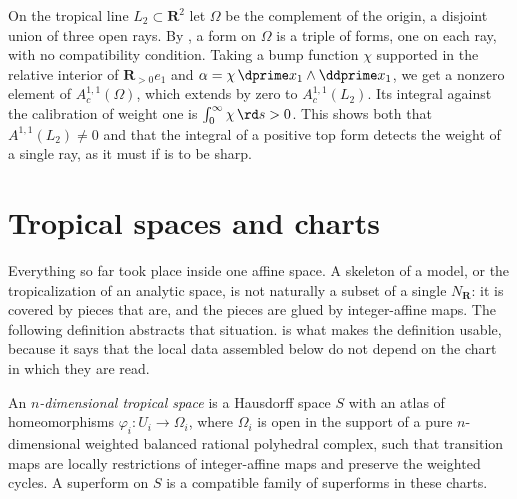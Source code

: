 \begin{example}
\label{ex:ch10-form-one-ray}
On the tropical line $L_2\subset\mathbf R^2$ let $\Omega$ be the complement
of the origin, a disjoint union of three open rays.  By
, a form on $\Omega$ is a triple of forms, one on
each ray, with no compatibility condition.  Taking a bump function $\chi$
supported in the relative interior of $\mathbf R_{>0}e_1$ and
$\alpha=\chi\,\dprime x_1\wedge\ddprime x_1$, we get a nonzero element of
$A^{1,1}_c(\Omega)$, which extends by zero to $A^{1,1}_c(L_2)$.  Its integral
against the calibration of weight one is $\int_0^\infty\chi\,\rd s>0$.  This
shows both that $A^{1,1}(L_2)\neq0$ and that the integral of a positive top
form detects the weight of a single ray, as it must if
 is to be sharp.
\end{example}

\section{Tropical spaces and charts}
\label{sec:ch10-tropical-spaces}

Everything so far took place inside one affine space.  A skeleton of a model,
or the tropicalization of an analytic space, is not naturally a subset of a
single $N_{\mathbf R}$: it is covered by pieces that are, and the pieces are
glued by integer-affine maps.  The following definition abstracts that
situation.   is what makes the
definition usable, because it says that the local data assembled below do not
depend on the chart in which they are read.

\begin{definition}
\label{def:ch10-tropical-space}
An \emph{$n$-dimensional tropical space} is a Hausdorff space $S$ with an
atlas of homeomorphisms $\varphi_i:U_i\to\Omega_i$, where $\Omega_i$ is open
in the support of a pure $n$-dimensional weighted balanced rational
polyhedral complex, such that transition maps are locally restrictions of
integer-affine maps and preserve the weighted cycles.  A superform on $S$ is
a compatible family of superforms in these charts.
\end{definition}

